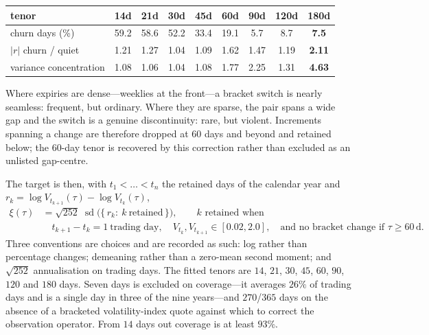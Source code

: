 \documentclass[11pt]{article}
\providecommand{\1}{\mathbf 1}
\begin{document}
\begin{center}{\small
\begin{tabular}{lcccccccc}
\toprule
tenor & 14d & 21d & 30d & 45d & 60d & 90d & 120d & 180d \\
\midrule
churn days (\%)              & 59.2 & 58.6 & 52.2 & 33.4 & 19.1 & 5.7 & 8.7 & \textbf{7.5} \\
$|r|$ churn / quiet          & 1.21 & 1.27 & 1.04 & 1.09 & 1.62 & 1.47 & 1.19 & \textbf{2.11} \\
variance concentration       & 1.08 & 1.06 & 1.04 & 1.08 & 1.77 & 2.25 & 1.31 & \textbf{4.63} \\
\bottomrule
\end{tabular}}\end{center}

\noindent Where expiries are dense---weeklies at the front---a bracket switch is nearly seamless:
frequent, but ordinary. Where they are sparse, the pair spans a wide gap and the switch is a genuine
discontinuity: rare, but violent. Increments spanning a change are therefore dropped at $60$ days and
beyond and retained below; the $60$-day tenor is recovered by this correction rather than excluded
as an unlisted gap-centre.

The target is then, with $t_1<\dots<t_n$ the retained days of the calendar year and
$r_k=\log V_{t_{k+1}}(\tau)-\log V_{t_k}(\tau)$,
\begin{equation}\label{eq:ndxvov}
\begin{aligned}
  \xi(\tau)&=\sqrt{252}\;\operatorname{sd}\bigl(\{\,r_k:\ k\ \text{retained}\,\}\bigr),
   \qquad\text{$k$ retained when}\\
  &\quad t_{k+1}-t_k=1\ \text{trading day},\quad V_{t_k},V_{t_{k+1}}\in[0.02,2.0],\quad
   \text{and no bracket change if }\tau\ge60\,\text{d}.
\end{aligned}
\end{equation}
Three conventions are choices and are recorded as such: log rather than
percentage changes; demeaning rather than a zero-mean second moment; and $\sqrt{252}$ annualisation
on trading days. The fitted tenors are $14$, $21$, $30$, $45$, $60$, $90$, $120$ and $180$ days.
Seven days is excluded on coverage---it averages $26\%$ of trading days and is a single day in three
of the nine years---and $270$/$365$ days on the absence of a bracketed volatility-index quote against
which to correct the observation operator. From $14$ days out coverage is at least $93\%$.
\end{document}
